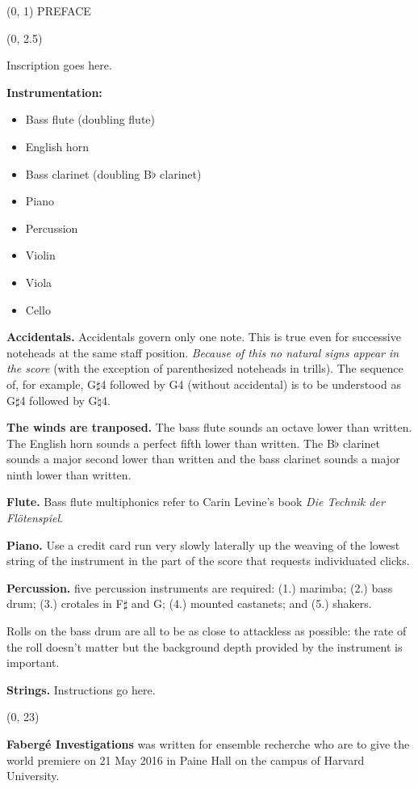 \documentclass[10pt]{article}
\begin{document}
\begin{textblock}{23}(0, 1)
\center \huge PREFACE
\end{textblock}

\begin{textblock}{23}(0, 2.5)

Inscription goes here.

\textbf{Instrumentation:}

\begin{itemize} \itemsep2pt
\item Bass flute (doubling flute)
\item English horn
\item Bass clarinet (doubling B$\flat$ clarinet)
\item Piano
\item Percussion
\item Violin
\item Viola
\item Cello
\end{itemize}


\textbf{Accidentals.} Accidentals govern only one note. This is true even for
successive noteheads at the same staff position. \textit{Because of this no
natural signs appear in the score} (with the exception of parenthesized
noteheads in trills). The sequence of, for example, G$\sharp$4 followed by
G4 (without accidental) is to be understood as G$\sharp$4 followed by
G$\natural$4.

\textbf{The winds are tranposed.} The bass flute sounds an octave lower than
written. The English horn sounds a perfect fifth lower than written. The
B$\flat$ clarinet sounds a major second lower than written and the bass
clarinet sounds a major ninth lower than written.

\textbf{Flute.} Bass flute multiphonics refer to Carin Levine's book
\textit{Die Technik der Flötenspiel}.

\textbf{Piano.} Use a credit card run very slowly laterally up the weaving of
the lowest string of the instrument in the part of the score that requests
individuated clicks.

\textbf{Percussion.} five percussion instruments are required: (1.) marimba;
(2.) bass drum; (3.) crotales in F$\sharp$ and G; (4.) mounted castanets; and
(5.) shakers.

Rolls on the bass drum are all to be as close to attackless as possible: the
rate of the roll doesn't matter but the background depth provided by the
instrument is important.

\textbf{Strings.} Instructions go here.

\end{textblock}

\begin{textblock}{23}(0, 23)

\textbf{Faberg\'{e} Investigations} was written for ensemble recherche who are
to give the world premiere on 21 May 2016 in Paine Hall on the campus of
Harvard University.

\end{textblock}
\end{document}
